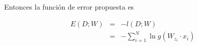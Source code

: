 \documentclass[a4paper]{article}
\begin{document}
\begin{enumerate}
{       Entonces la función de error propuesta es

       \begin{eqnarray*}
        E(D;W) &=& -l(D;W) \\
        &=& -\sum_{i = 1}^{N}
        \ln g(W_{z_i}\cdot x_i)
       \end{eqnarray*}







       }
\end{enumerate}
\end{document}
